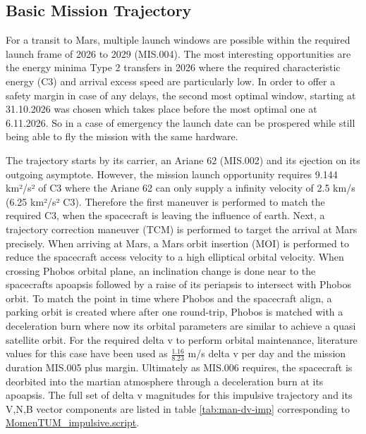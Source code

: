 \documentclass[conference]{IEEEtran}
\begin{document}
\subsection{Basic Mission Trajectory}
For a transit to Mars, multiple launch windows are possible within the required launch frame of 2026 to 2029 (MIS.004). The most interesting opportunities are the energy minima Type 2 transfers in 2026 \cite{Burke.2010} where the required characteristic energy (C3) and arrival excess speed are particularly low. In order to offer a safety margin in case of any delays, the second most optimal window, starting at 31.10.2026 was chosen which takes place before the most optimal one at 6.11.2026. So in a case of emergency the launch date can be prospered while still being able to fly the mission with the same hardware.

The trajectory starts by its carrier, an Ariane 62 (MIS.002) and its ejection on its outgoing asymptote. However, the mission launch opportunity requires 9.144 km²/s² of C3 where the Ariane 62 can only supply a infinity velocity of 2.5 km/s (6.25 km²/s² C3). Therefore the first maneuver is performed to match the required C3, when the spacecraft is leaving the influence of earth. Next, a trajectory correction maneuver (TCM) is performed to target the arrival at Mars precisely. When arriving at Mars, a Mars orbit insertion (MOI) is performed to reduce the spacecraft access velocity to a high elliptical orbital velocity. When crossing Phobos orbital plane, an inclination change is done near to the spacecrafts apoapsis followed by a raise of its periapsis to intersect with Phobos orbit. To match the point in time where Phobos and the spacecraft align, a parking orbit is created where after one round-trip, Phobos is matched with a deceleration burn where now its orbital parameters are similar to achieve a quasi satellite orbit. For the required delta v to perform orbital maintenance, literature values for this case have been used as $\frac{1.16}{8.23}$ m/s delta v per day \cite{Chen2020} and the mission duration MIS.005 plus margin. Ultimately as MIS.006 requires, the spacecraft is deorbited into the martian atmosphere through a deceleration burn at its apoapsis. The full set of delta v magnitudes for this impulsive trajectory and its V,N,B vector components are listed in table \ref{tab:man-dv-imp} corresponding to \href{https://github.com/Sven-J-Steinert/MomenTUM/blob/main/GMAT/MomenTUM_impulsive.script}{\colorbox{codegray}{MomenTUM\_impulsive.script}}.
\end{document}
